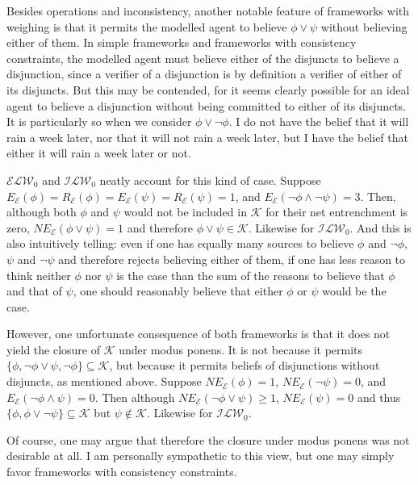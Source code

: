 \documentclass[12pt]{article}
\newcommand{\K}{\mathcal{K}}
\begin{document}
\par
Besides operations and inconsistency, another notable feature of frameworks with weighing is that it permits the modelled agent to believe $\phi \lor \psi$ without believing either of them. In simple frameworks and frameworks with consistency constraints, the modelled agent must believe either of the disjuncts to believe a disjunction, since a verifier of a disjunction is by definition a verifier of either of its disjuncts. But this may be contended, for it seems clearly possible for an ideal agent to believe a disjunction without being committed to either of its disjuncts. It is particularly so when we consider $\phi \lor \lnot \phi$. I do not have the belief that it will rain a week later, nor that it will not rain a week later, but I have the belief that either it will rain a week later or not. 
\par
$\mathcal{ELW}_0$ and $\mathcal{ILW}_0$ neatly account for this kind of case. Suppose $E_\mathcal{E}(\phi) = R_\mathcal{E}(\phi) = E_\mathcal{E}(\psi) = R_\mathcal{E}(\psi) = 1$, and $E_\mathcal{E}(\lnot \phi \land \lnot \psi) = 3$. Then, although both $\phi$ and $\psi$ would not be included in $\K$ for their net entrenchment is zero, $NE_\mathcal{E}(\phi \lor \psi) = 1$ and therefore $\phi \lor \psi \in \K$. Likewise for $\mathcal{ILW}_0$. And this is also intuitively telling: even if one has equally many sources to believe $\phi$ and $\lnot \phi$, $\psi$ and $\lnot \psi$ and therefore rejects believing either of them, if one has less reason to think neither $\phi$ nor $\psi$ is the case than the sum of the reasons to believe that $\phi$ and that of $\psi$, one should reasonably believe that either $\phi$ or $\psi$ would be the case. 
\par
However, one unfortunate consequence of both frameworks is that it does not yield the closure of $\K$ under modus ponens. It is not because it permits $\{\phi, \lnot \phi \lor \psi, \lnot \phi\}\subseteq \K$, but because it permits beliefs of disjunctions without disjuncts, as mentioned above. Suppose $NE_\mathcal{E}(\phi) = 1$, $NE_\mathcal{E}(\lnot \psi) = 0$, and $E_\mathcal{E}(\lnot \phi \land \psi) = 0$. Then although $NE_\mathcal{E}(\lnot \phi \lor \psi) \geq 1$, $NE_\mathcal{E}(\psi) = 0$ and thus $\{\phi, \phi \lor \lnot \psi \} \subseteq \K$ but $\psi \notin \K$. Likewise for $\mathcal{ILW}_0$. 
\par
Of course, one may argue that therefore the closure under modus ponens was not desirable at all. I am personally sympathetic to this view, but one may simply favor frameworks with consistency constraints.
\end{document}
